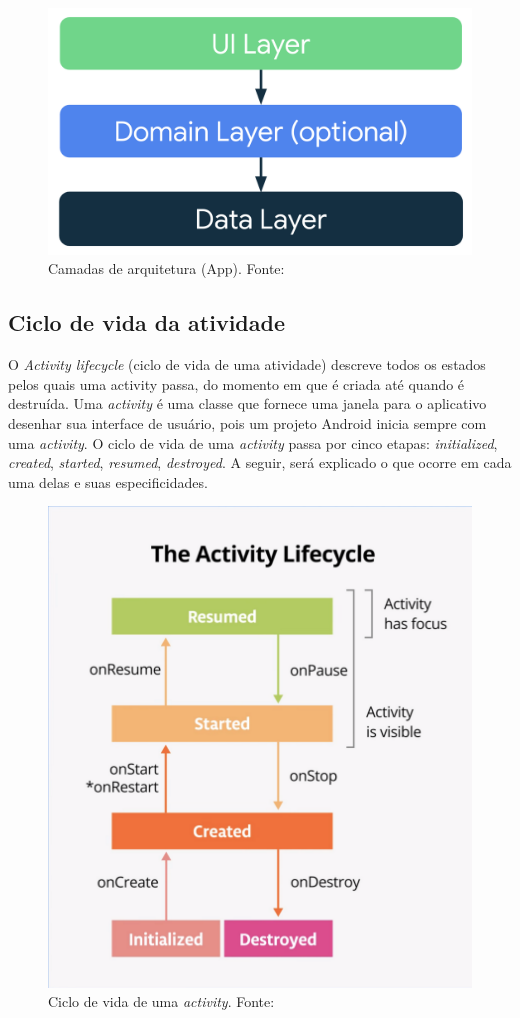 \begin{figure}[ht]
    \centering
    \includegraphics[width=.73\textwidth]{img/app-android-layers.png}
    \caption{Camadas de arquitetura (App). Fonte:\cite{google-developers-guideline}}\label{figAppLayer}
\end{figure}

\subsection{Ciclo de vida da atividade}\label{ciclo-de-vida}

O \textit{Activity lifecycle} (ciclo de vida de uma atividade) descreve todos os estados pelos quais uma activity passa, do momento em que é criada
até quando é destruída. Uma \textit{activity} é uma classe que fornece uma janela para o aplicativo desenhar sua interface de usuário, pois um projeto Android 
inicia sempre com uma \textit{activity}. O ciclo de vida de uma \textit{activity} passa por cinco etapas: 
\textit{initialized}, \textit{created}, \textit{started}, \textit{resumed}, \textit{destroyed}. A seguir, será explicado o que ocorre em cada 
uma delas e suas especificidades.

\begin{figure}[ht]
    \centering
    \includegraphics[width=.37\textwidth]{img/activity-lifecycle.png}
    \caption{Ciclo de vida de uma \textit{activity}. Fonte:\cite{google-developers-activity-lifecycle}}\label{figActivityLifeCycle}
\end{figure}

